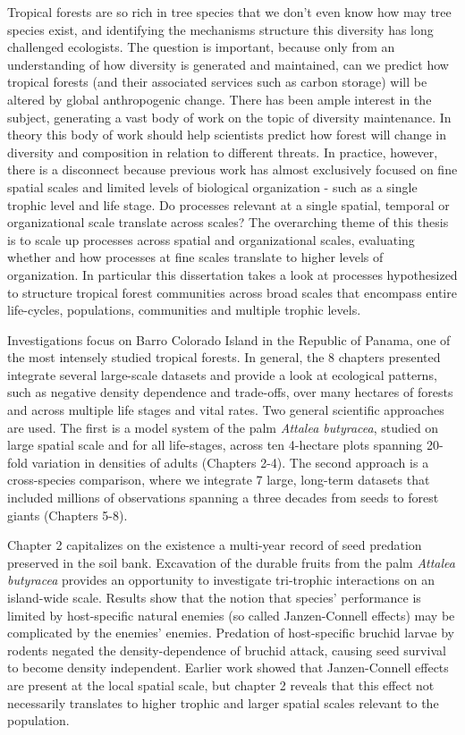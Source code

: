 \documentclass[b5paper,justified]{tufte-book} %
\begin{document}
\begin{fullwidth}
Tropical forests are so rich in tree species that we don't even know how may tree species exist, and identifying the mechanisms structure this diversity has long challenged ecologists. The question is important, because only from an understanding of how diversity is generated and maintained, can we predict how tropical forests (and their associated services such as carbon storage) will be altered by global anthropogenic change. There has been ample interest in the subject, generating a vast body of work on the topic of diversity maintenance. In theory this body of work should help scientists predict how forest will change in diversity and composition  in relation to different threats. In practice, however, there is a disconnect because previous work has almost exclusively focused on fine spatial scales and limited levels of biological organization - such as a single trophic level and life stage.  Do processes relevant at a single spatial, temporal or organizational scale translate across scales? The overarching theme of this thesis is to scale up processes across spatial and organizational scales, evaluating whether and how processes at fine scales translate to higher levels of organization. In particular this dissertation takes a look at processes hypothesized to structure tropical forest communities across broad scales that encompass entire life-cycles, populations, communities and multiple trophic levels.  

Investigations focus on Barro Colorado Island in the Republic of Panama, one of the most intensely studied tropical forests. In general, the 8 chapters presented integrate several large-scale datasets and provide a look at ecological patterns, such as negative density dependence and trade-offs, over many hectares of forests and across multiple life stages and vital rates. Two general scientific approaches are used. The first is a model system of the palm \textit{Attalea butyracea}, studied on large spatial scale and for all life-stages, across ten 4-hectare plots spanning 20-fold variation in densities of adults (Chapters 2-4).  The second approach is a cross-species comparison, where we integrate 7 large, long-term datasets that included millions of observations spanning a three decades from seeds to forest giants (Chapters 5-8).   

Chapter 2 capitalizes on the existence a multi-year record of seed predation preserved in the soil bank. Excavation of the durable fruits from the palm \textit{Attalea butyracea} provides an opportunity to investigate tri-trophic interactions on an island-wide scale. Results show that the notion that species' performance is limited by host-specific natural enemies (so called Janzen-Connell effects) may be complicated by the enemies' enemies.  Predation of host-specific bruchid larvae by rodents negated the density-dependence of bruchid attack, causing seed survival to become density independent. Earlier work showed that Janzen-Connell effects are present at the local spatial scale, but chapter 2 reveals that this effect not necessarily translates to higher trophic and larger spatial scales relevant to the population. 


\end{fullwidth}
\end{document}
